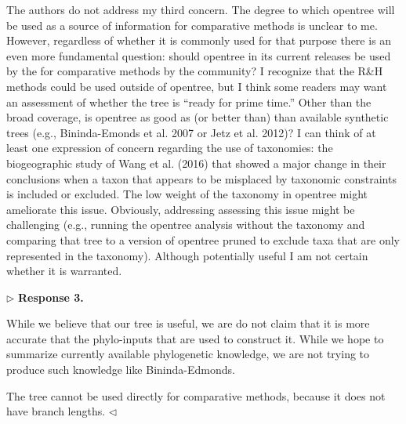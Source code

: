 \documentclass{article}
\newenvironment{reply}{$\triangleright$\bf}{$\triangleleft$}
\begin{document}





The authors do not address my third concern. The degree to which opentree will be used as a source of information for comparative methods is unclear to me. However, regardless of whether it is commonly used for that purpose there is an even more fundamental question: should opentree in its current releases be used by the for comparative methods by the community? I recognize that the R\&H methods could be used outside of opentree, but I think some readers may want an assessment of whether the tree is “ready for prime time.” Other than the broad coverage, is opentree as good as (or better than) than available synthetic trees (e.g., Bininda-Emonds et al. 2007 or Jetz et al. 2012)? I can think of at least one expression of concern regarding the use of taxonomies: the biogeographic study of Wang et al. (2016) that showed a major change in their conclusions when a taxon that appears to be misplaced by taxonomic constraints is included or excluded. The low weight of the taxonomy in opentree might ameliorate this issue. Obviously, addressing assessing this issue might be challenging (e.g., running the opentree analysis without the taxonomy and comparing that tree to a version of opentree pruned to exclude taxa that are only represented in the taxonomy). Although potentially useful I am not certain whether it is warranted.

\begin{reply}
Response 3.

While we believe that our tree is useful, we are do not claim that it is more accurate that the phylo-inputs that are used to construct it.  While we hope to summarize currently available phylogenetic knowledge, we are not trying to produce such knowledge like Bininda-Edmonds.

The tree cannot be used directly for comparative methods, because it does not have branch lengths.
\end{reply}
\end{document}
